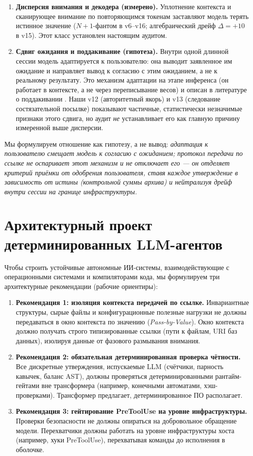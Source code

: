 \documentclass[11pt,a4paper]{article}
\begin{document}
\begin{enumerate}
    \item \textbf{Дисперсия внимания и декодера (измерено).} Уплотнение контекста и сканирующее внимание по повторяющимся токенам заставляют модель терять истинное значение ($N{+}1$-фантом в v6--v16; алгебраический дрейф $\Delta{=}+10$ в v15). Этот класс установлен настоящим аудитом.
    \item \textbf{Сдвиг ожидания и поддакивание (гипотеза).} Внутри одной длинной сессии модель адаптируется к пользователю: она выводит заявленное им ожидание и направляет вывод к согласию с этим ожиданием, а не к реальному результату. Это механизм адаптации на этапе инференса (он работает в контексте, а не через переписывание весов) и описан в литературе о поддакивании \cite{sharma2023sycophancy}. Наши v12 (авторитетный якорь) и v13 (следование состязательной посылке) показывают частичные, статистически незначимые признаки этого сдвига, но аудит \emph{не} устанавливает его как главную причину измеренной выше дисперсии.
\end{enumerate}

Мы формулируем отношение как гипотезу, а не вывод: \emph{адаптация к пользователю смещает модель к согласию с ожиданием; протокол передачи по ссылке не оспаривает этот механизм и не отключает его — он отделяет критерий приёмки от одобрения пользователя, ставя каждое утверждение в зависимость от истины (контрольной суммы архива) и нейтрализуя дрейф внутри сессии на границе инфраструктуры.}

\section{Архитектурный проект детерминированных LLM-агентов}
\label{sec:architecture}

Чтобы строить устойчивые автономные ИИ-системы, взаимодействующие с операционными системами и компиляторами кода, мы формулируем три архитектурные рекомендации (рабочие ориентиры):

\begin{enumerate}
    \item \textbf{Рекомендация 1: изоляция контекста передачей по ссылке.} Инвариантные структуры, сырые файлы и конфигурационные полезные нагрузки не должны передаваться в окно контекста по значению (\textit{Pass-by-Value}). Окно контекста должно получать строго типизированные ссылки (пути к файлам, URI баз данных), изолируя данные от фазового размывания внимания.
    \item \textbf{Рекомендация 2: обязательная детерминированная проверка чётности.} Все дискретные утверждения, испускаемые LLM (счётчики, парность кавычек, баланс AST), должны проверяться детерминированными рантайм-гейтами вне трансформера (например, конечными автоматами, хэш-проверками). Трансформер предлагает, детерминированное ПО располагает.
    \item \textbf{Рекомендация 3: гейтирование PreToolUse на уровне инфраструктуры.} Проверки безопасности не должны опираться на добровольное обращение модели. Перехватчики должны работать на уровне инфраструктуры хоста (например, хуки PreToolUse), перехватывая команды до исполнения в оболочке.
\end{enumerate}
\end{document}
